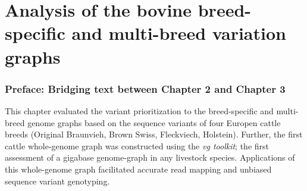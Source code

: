 \documentclass[11 pt, a4paper, notitlepage, twoside]{report}
\begin{document}
\begin{center}\end{center}




\iftwoside
\cleardoublepage
\newpage
\fi



\chapter[Bovine whole-genome variation graphs]{\LARGE{Analysis of the bovine breed-specific and multi-breed variation graphs}}
\label{chap:wholegraph}

\subsection*{Preface: Bridging text between Chapter 2 and Chapter 3}
\normalsize
This chapter evaluated the variant prioritization to the breed-specific and multi-breed genome graphs based on the sequence variants of four Europen cattle breeds (Original Braunvieh, Brown Swiss, Fleckviech, Holstein). Further, the first cattle whole-genome graph was constructed using the \emph{vg toolkit}; the first assessment of a gigabase genome-graph in any livestock species. Applications of this whole-genome graph facilitated accurate read mapping and unbiased sequence variant genotyping. \\


\bigskip

\begin{center}\end{center}
\end{document}
